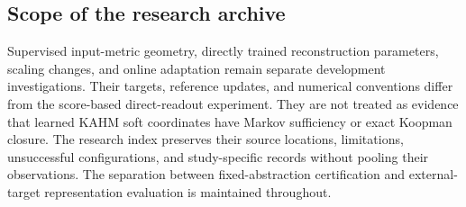 \subsection{Scope of the research archive}
Supervised input-metric geometry, directly trained reconstruction parameters, scaling changes, and online adaptation remain separate development investigations. Their targets, reference updates, and numerical conventions differ from the score-based direct-readout experiment. They are not treated as evidence that learned KAHM soft coordinates have Markov sufficiency or exact Koopman closure. The research index preserves their source locations, limitations, unsuccessful configurations, and study-specific records without pooling their observations. The separation between fixed-abstraction certification \citep{KumarKargaran2026Limits} and external-target representation evaluation is maintained throughout.
